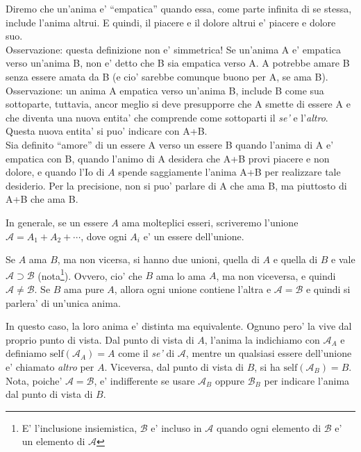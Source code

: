 Diremo che un'anima e' ``empatica'' quando essa, come parte infinita di se stessa, include l'anima altrui. E quindi, il piacere e il dolore altrui e' piacere e dolore suo. \\
Osservazione: questa definizione non e' simmetrica! Se un'anima A e' empatica verso un'anima B, non e' detto che B sia empatica verso A. A potrebbe amare B senza essere amata da B (e cio' sarebbe comunque buono per A, se ama B). \\
Osservazione: un anima A empatica verso un'anima B, include B come sua sottoparte, tuttavia, ancor meglio si deve presupporre che A smette di essere A e che diventa una nuova entita' che comprende come sottoparti il \emph{se'} e l'\emph{altro}. Questa nuova entita' si puo' indicare con A+B. \\

Sia definito ``amore'' di un essere A verso un essere B quando l'anima di A e' empatica con B, quando l'animo di A desidera che A+B provi piacere e non dolore, e quando l'Io di $A$ spende saggiamente l'anima A+B per realizzare tale desiderio. Per la precisione, non si puo' parlare di A che ama B, ma piuttosto di A+B che ama B. 

In generale, se un essere $A$ ama molteplici esseri, scriveremo l'unione $\mathcal{A}=A_1+A_2+\cdots$, dove ogni $A_i$ e' un essere dell'unione.

\def\self{\textrm{self}}
\def\other{\textrm{other}}

Se $A$ ama $B$, ma non vicersa, si hanno due unioni, quella di $A$ e quella di $B$ e vale $\mathcal{A} \supset \mathcal{B}$ (nota\footnote{E' l'inclusione insiemistica, $\mathcal{B}$ e' incluso in $\mathcal{A}$ quando ogni elemento di $\mathcal{B}$ e' un elemento di $\mathcal{A}$}).  Ovvero, cio' che $B$ ama lo ama $A$, ma non viceversa, e quindi $\mathcal{A} \neq \mathcal{B}$. Se $B$ ama pure $A$, allora ogni unione contiene l'altra e $\mathcal{A} = \mathcal{B}$ e quindi si parlera' di un'unica anima. 

In questo caso, la loro anima e' distinta ma equivalente.  Ognuno pero' la vive dal proprio punto di vista. Dal punto di vista di $A$, l'anima la indichiamo con $\mathcal{A}_A$ e definiamo $\textrm{self}(\mathcal{A}_A)=A$ come il \emph{se'} di $\mathcal{A}$, mentre un qualsiasi essere dell'unione e' chiamato \emph{altro} per $A$. Viceversa, dal punto di vista di $B$, si ha $\textrm{self}(\mathcal{A}_B)=B$. Nota, poiche' $\mathcal{A}=\mathcal{B}$, e' indifferente se usare $\mathcal{A}_B$ oppure $\mathcal{B}_B$ per indicare l'anima dal punto di vista di $B$.

